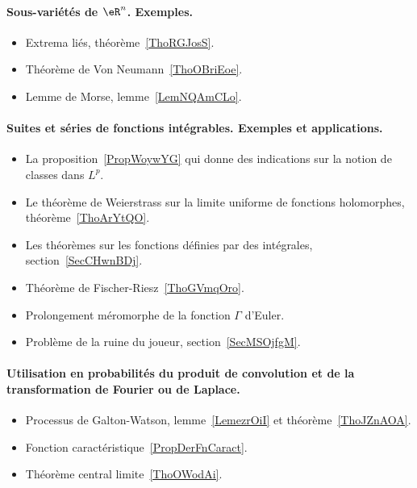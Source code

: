 \paragraph{Sous-variétés de \( \eR^n\). Exemples.}
\begin{itemize}
	\item Extrema liés, théorème~\ref{ThoRGJosS}.
	\item Théorème de Von Neumann~\ref{ThoOBriEoe}.
	\item Lemme de Morse, lemme~\ref{LemNQAmCLo}.
\end{itemize}
\paragraph{Suites et séries de fonctions intégrables. Exemples et applications.}
\begin{itemize}
	\item La proposition~\ref{PropWoywYG} qui donne des indications sur la notion de classes dans \( L^p\).
	\item Le théorème de Weierstrass sur la limite uniforme de fonctions holomorphes, théorème~\ref{ThoArYtQO}.
	\item Les théorèmes sur les fonctions définies par des intégrales, section~\ref{SecCHwnBDj}.
	\item Théorème de Fischer-Riesz~\ref{ThoGVmqOro}.
	\item Prolongement méromorphe de la fonction \( \Gamma\) d'Euler.
	\item Problème de la ruine du joueur, section~\ref{SecMSOjfgM}.
\end{itemize}
\paragraph{Utilisation en probabilités du produit de convolution et de la transformation de Fourier ou de Laplace.}
\begin{itemize}
	\item Processus de Galton-Watson, lemme~\ref{LemezrOiI} et théorème~\ref{ThoJZnAOA}.
	\item Fonction caractéristique~\ref{PropDerFnCaract}.
	\item Théorème central limite~\ref{ThoOWodAi}.
\end{itemize}
